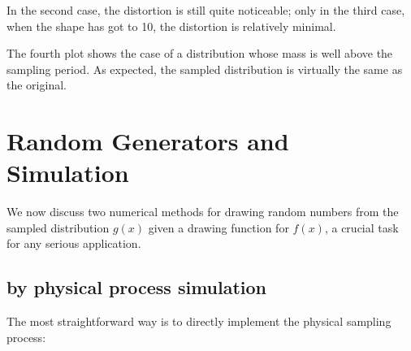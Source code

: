 \documentclass[]{article}
\begin{document}
In the second case, the distortion is still quite noticeable; only in
the third case, when the shape has got to 10, the distortion is
relatively minimal.

The fourth plot shows the case of a distribution whose mass is well
above the sampling period. As expected, the sampled distribution is
virtually the same as the original.

\hypertarget{random-generators-and-simulation}{%
\section{Random Generators and
Simulation}\label{random-generators-and-simulation}}

We now discuss two numerical methods for drawing random numbers from the
sampled distribution \(g(x)\) given a drawing function for \(f(x)\), a
crucial task for any serious application.

\hypertarget{by-physical-process-simulation}{%
\subsection{by physical process
simulation}\label{by-physical-process-simulation}}

The most straightforward way is to directly implement the physical
sampling process:
\end{document}
